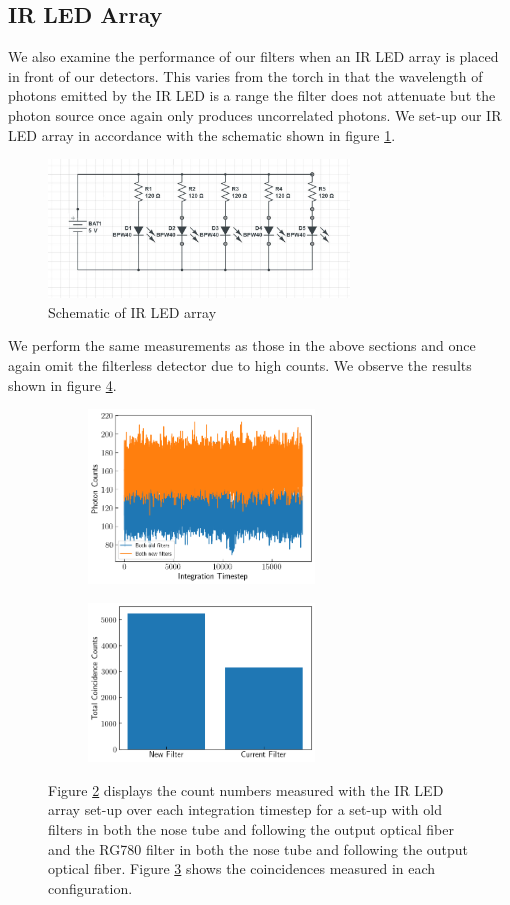 \documentclass[letterpaper, 11 pt]{book}
\begin{document}
\subsection{IR LED Array}
We also examine the performance of our filters when an IR LED array is placed in front of
our detectors. This varies from the torch in that the wavelength of photons emitted by
the IR LED is a range the filter does not attenuate but the photon source once again only produces
uncorrelated photons. We set-up our IR LED array in accordance with the schematic shown in figure \ref{fig:led_scheme}.
\begin{figure}[H]
    \centering
    \includegraphics[width = 8cm]{IR_LED.jpg}
    \caption{Schematic of IR LED array}
    \label{fig:led_scheme}
\end{figure}
We perform the same measurements as those in the above sections and once again omit
the filterless detector due to high counts. We observe the results shown in figure \ref{fig:ir_comp}.
\begin{figure}[H]%
    \centering
    \begin{subfigure}{.4\textwidth}
    \includegraphics[width=6cm]{filter_ch1_IRled.png}
    \caption{ }
    \label{fig:irch1}
    \end{subfigure}
    \begin{subfigure}{.4\textwidth}
    \includegraphics[width = 6cm]{filter_cc_irled.png}
    \caption{ }
    \label{fig:ircc}
    \end{subfigure}
    \caption{Figure \ref{fig:irch1} displays the count numbers measured with the IR LED array set-up over each
    integration timestep for a set-up with old filters in both the
    nose tube and following the output optical fiber and the RG780 filter in
    both the nose tube and following the output optical fiber. Figure
    \ref{fig:ircc} shows the coincidences measured in each configuration.}
    \label{fig:ir_comp}
\end{figure}
\end{document}
